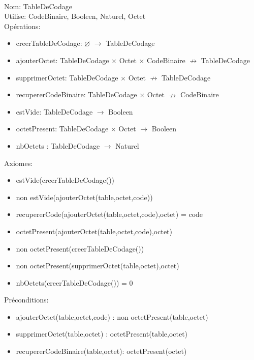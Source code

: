 \documentclass{article}
\begin{document}
    \noindent
    \thispagestyle{empty} \\
    Nom: TableDeCodage \\
    Utilise: CodeBinaire, Booleen, Naturel, Octet \\
    Opérations: \begin{itemize}[label=$\ $, leftmargin=2cm]
        \item creerTableDeCodage:  $\varnothing$ $\rightarrow$ TableDeCodage 
        \item ajouterOctet: TableDeCodage $\times$ Octet $\times$ CodeBinaire $\nrightarrow$ TableDeCodage 
        \item supprimerOctet: TableDeCodage $\times$ Octet $ \nrightarrow $ TableDeCodage
        \item recupererCodeBinaire: TableDeCodage $\times$ Octet $\nrightarrow$ CodeBinaire
        \item estVide: TableDeCodage $\rightarrow$ Booleen
        \item octetPresent: TableDeCodage $\times$ Octet $\rightarrow$ Booleen
        \item nbOctets : TableDeCodage $\rightarrow$ Naturel
    \end{itemize}
    Axiomes: \begin{itemize}[label=$\- $, leftmargin=2cm]
        \item estVide(creerTableDeCodage())
        \item non estVide(ajouterOctet(table,octet,code))
        \item recupererCode(ajouterOctet(table,octet,code),octet) = code
        \item octetPresent(ajouterOctet(table,octet,code),octet)
        \item non octetPresent(creerTableDeCodage())
        \item non octetPresent(supprimerOctet(table,octet),octet) 
        \item nbOctets(creerTableDeCodage()) = 0
    \end{itemize}
    Préconditions: \begin{itemize}[label=$\- $, leftmargin=2cm]
        \item ajouterOctet(table,octet,code) : non octetPresent(table,octet)
        \item supprimerOctet(table,octet) : octetPresent(table,octet)
        \item recupererCodeBinaire(table,octet): octetPresent(octet)
    \end{itemize}
\end{document}
